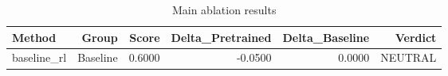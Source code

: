 \begin{table}[htbp]
\centering
\caption{Main ablation results}
\label{tab:main-results}
\begin{tabular}{lrrrrr}
\toprule
\textbf{Method} & \textbf{Group} & \textbf{Score} & \textbf{Delta\_Pretrained} & \textbf{Delta\_Baseline} & \textbf{Verdict} \\
\midrule
baseline\_rl & Baseline & 0.6000 & -0.0500 & 0.0000 & NEUTRAL \\
\bottomrule
\end{tabular}
\end{table}